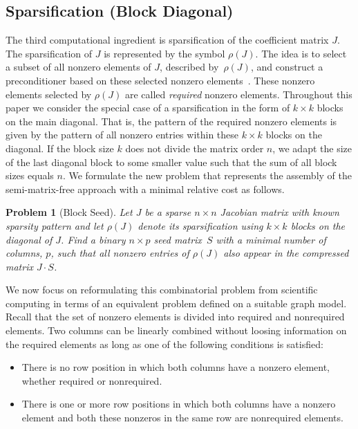 \documentclass[12pt, oneside]{book}
\newtheorem{problem}{Problem}
\newcommand{\sparsifysymbol}{\ensuremath{\rho}}
\newcommand{\sparsify}[1]{\ensuremath{\sparsifysymbol(#1)}}
\begin{document}
\subsection{Sparsification (Block Diagonal)}
The third computational ingredient is sparsification of the coefficient matrix $J$. The
sparsification of $J$ is represented by the symbol \sparsify{J}. The idea is to select a
subset of all nonzero elements of $J$, described by~\sparsify{J}, and construct a
preconditioner based on these selected nonzero elements~\cite{Cullum2006}. These nonzero
elements selected by \sparsify{J} are called \emph{required} nonzero elements. Throughout
this paper we consider the special case of a sparsification in the form of $k\times k$
blocks on the main diagonal. That is, the pattern of the required nonzero elements is
given by the pattern of all nonzero entries within these $k\times k$ blocks on the
diagonal. If the block size $k$ does not divide the matrix order $n$, we adapt the size
of the last diagonal block to some smaller value such that the sum of all block sizes
equals $n$. We formulate the new problem that represents the assembly of the
semi-matrix-free approach with a minimal relative cost as follows.
%
\begin{problem}[Block Seed]
\label{p:block}
%
Let $J$ be a sparse $n \times n$ Jacobian matrix with known sparsity pattern and let
\sparsify{J} denote its sparsification using $k \times k$ blocks on the diagonal of $J$.
Find a binary $n \times p$ seed matrix~$S$ with a minimal number of columns, $p$, such
that all nonzero entries of \sparsify{J} also appear in the compressed matrix $J \cdot
S$.
\end{problem}

We now focus on reformulating this combinatorial problem from
scientific computing in terms of an equivalent problem defined on a suitable graph model.
Recall that the set of nonzero elements is divided into required and nonrequired
elements. Two columns can be linearly combined without loosing information on the
required elements as long as one of the following conditions is satisfied:
\begin{itemize}
  \item There is no row position in which both columns have a nonzero element, whether
      required or nonrequired.
  \item There is one or more row positions in which both columns have a nonzero element
      and both these nonzeros in the same row are nonrequired elements.
\end{itemize}
\end{document}
